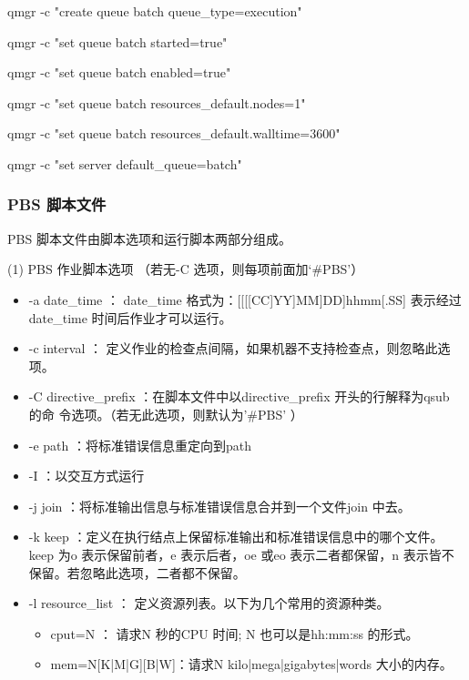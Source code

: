 {qmgr -c "create queue batch queue\_type=execution"

qmgr -c "set queue batch started=true"

qmgr -c "set queue batch enabled=true"

qmgr -c "set queue batch resources\_default.nodes=1"

qmgr -c "set queue batch resources\_default.walltime=3600"

qmgr -c "set server default\_queue=batch"



\subsubsection{PBS 脚本文件}
PBS 脚本文件由脚本选项和运行脚本两部分组成。

(1) PBS 作业脚本选项 （若无-C 选项，则每项前面加‘\#PBS’）
\begin{itemize}
\item -a date\_time ： date\_time 格式为：[[[[CC]YY]MM]DD]hhmm[.SS]
表示经过date\_time 时间后作业才可以运行。

\item -c interval ： 定义作业的检查点间隔，如果机器不支持检查点，则忽略此选项。

\item -C directive\_prefix ：在脚本文件中以directive\_prefix 开头的行解释为qsub 的命
令选项。（若无此选项，则默认为’\#PBS’ ）

\item -e path ：将标准错误信息重定向到path

\item -I ：以交互方式运行

\item -j join ：将标准输出信息与标准错误信息合并到一个文件join 中去。

\item  -k keep ：定义在执行结点上保留标准输出和标准错误信息中的哪个文件。
keep 为o 表示保留前者，e 表示后者，oe 或eo 表示二者都保留，n 表示皆不保留。若忽略此选项，二者都不保留。

\item -l resource\_list ： 定义资源列表。以下为几个常用的资源种类。
	\begin{itemize}
	\item  cput=N ： 请求N 秒的CPU 时间; N 也可以是hh:mm:ss 的形式。	
	
	\item mem=N[K|M|G][B|W]：请求N {kilo|mega|giga}{bytes|words} 大小的内存。
	

\end{itemize}
\end{itemize}}
